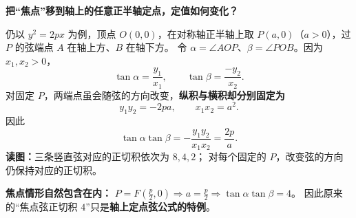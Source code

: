 \clearpage
\begin{explanationbox}
\textbf{把“焦点”移到轴上的任意正半轴定点，定值如何变化？}
\begin{center}\end{center}
仍以 $y^2=2px$ 为例，顶点 $O(0,0)$，在对称轴正半轴上取
$P(a,0)$（$a>0$），过 $P$ 的弦端点 $A$ 在轴上方、$B$ 在轴下方。
令 $\alpha=\angle AOP$、$\beta=\angle POB$。因为 $x_1,x_2>0$，
\[
 \tan\alpha=\frac{y_1}{x_1},\qquad
 \tan\beta=\frac{-y_2}{x_2}.
\]
对固定 $P$，两端点虽会随弦的方向改变，\textbf{纵积与横积却分别固定为}
\[
 y_1y_2=-2pa,\qquad x_1x_2=a^2.
\]
因此
\[
 \boxed{\tan\alpha\tan\beta
 =-\frac{y_1y_2}{x_1x_2}=\frac{2p}{a}}.
\]
\textbf{读图：}三条竖直弦对应的正切积依次为 $8,4,2$；
对每个固定的 $P$，改变弦的方向仍保持对应的正切积。

\medskip
\textbf{焦点情形自然包含在内：}
$P=F(\frac p2,0)\Longrightarrow a=\frac p2
\Longrightarrow \tan\alpha\tan\beta=4$。
因此原来的“焦点弦正切积 $4$”只是\textbf{轴上定点弦公式的特例}。
\end{explanationbox}
